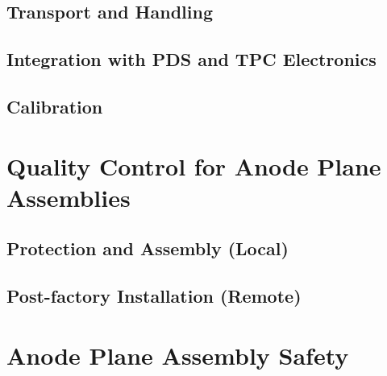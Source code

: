 \subsection{Transport and Handling}
\label{sec:fdsp-apa-install-transport}


\subsection{Integration with PDS and TPC Electronics}
\label{sec:fdsp-apa-install-pds-elec}


\subsection{Calibration}
\label{sec:fdsp-apa-install-calib}




\section{Quality Control for Anode Plane Assemblies}
\label{sec:fdsp-apa-qc}

\subsection{Protection and Assembly (Local)}
\label{sec:fdsp-apa-qc-local}


\subsection{Post-factory Installation (Remote)}
\label{sec:fdsp-apa-qc-remote}



\section{Anode Plane Assembly Safety}
\label{sec:fdsp-apa-safety}



